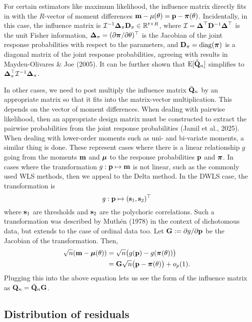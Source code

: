 \documentclass[
  letterpaper,
  DIV=11,
  numbers=noendperiod]{scrartcl}
\begin{document}
For certain estimators like maximum likelihood, the influence matrix
directly fits in with the \(R\)-vector of moment differences
\({\mathbf m} - \mu(\theta) = {\mathbf p} - {\boldsymbol\pi}(\theta)\). Incidentally, in this case,
the influence matrix is
\({\mathcal I}^{-1} {\boldsymbol\Delta}_\pi {\mathbf D}_\pi \in \mathbb{R}^{t \times R}\), where
\({\mathcal I}= {\boldsymbol\Delta}^\top {\mathbf D}^{-1} {\boldsymbol\Delta}^\top\) is the unit Fisher
information, \({\boldsymbol\Delta}_\pi= (\partial {\boldsymbol\pi} / \partial \theta)^\top\) is
the Jacobian of the joint response probabilities with respect to the
parameters, and \({\mathbf D}_\pi = \operatorname{diag}({\boldsymbol\pi})\) is a diagonal matrix of the
joint response probabilities, agreeing with results in Maydeu-Olivares
\& Joe (2005). It can be further shown that \(\operatorname{E}[\tilde{{\mathbf Q}}_n]\)
simplifies to \({\boldsymbol\Delta}_\pi^\top {\mathcal I}^{-1} {\boldsymbol\Delta}_\pi\).

In other cases, we need to post multiply the influence matrix
\(\tilde{{\mathbf Q}}_n\) by an appropriate matrix so that it fits into the
matrix-vector multiplication. This depends on the vector of moment
differences. When dealing with pairwise likelihood, then an appropriate
design matrix must be constructed to extract the pairwise probabilities
from the joint response probabilities (Jamil et al., 2025). When dealing
with lower-order moments such as uni- and bi-variate moments, a similar
thing is done. These represent cases where there is a linear
relationship \(g\) going from the moments \({\mathbf m}\) and \({\boldsymbol\mu}\) to the
response probabilities \({\mathbf p}\) and \({\boldsymbol\pi}\). In cases where the
transformation \(g: {\mathbf p} \mapsto {\mathbf m}\) is not linear, such as the
commonly used WLS methods, then we appeal to the Delta method. In the
DWLS case, the transformation is \[
g: {\mathbf p} \mapsto ({\mathbf s}_1, {\mathbf s}_2)^\top
\] where \({\mathbf s}_1\) are thresholds and \({\mathbf s}_2\) are the polychoric
correlations. Such a transformation was described by Muthén (1978) in
the context of dichotomous data, but extends to the case of ordinal data
too. Let \({\mathbf G} := \partial g / \partial {\mathbf p}\) be the Jacobian of the
transformation. Then, \[
\begin{aligned}
\sqrt n ({\mathbf m} - {\boldsymbol\mu}(\theta)) 
&= \sqrt n \big(g({\mathbf p}) - g({\boldsymbol\pi}(\theta))\big) \\
&= {\mathbf G} \sqrt n \big({\mathbf p} - {\boldsymbol\pi}(\theta)\big) + o_p(1).
\end{aligned}
\] Plugging this into the above equation lets us see the form of the
influence matrix as \({\mathbf Q}_n = \tilde{{\mathbf Q}}_n {\mathbf G}\).

\subsection{Distribution of residuals}\label{distribution-of-residuals}
\end{document}

